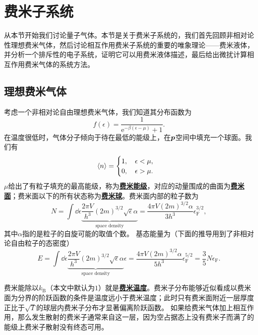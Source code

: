\documentclass[hyperref, UTF8, a4paper]{ctexart}
\newcommand*{\ee}{\mathrm{e}}
\newcommand{\concept}[1]{\underline{\textbf{#1}}}
\begin{document}
\section{费米子系统}

从本节开始我们讨论量子气体。本节是关于费米子系统的，我们首先回顾非相对论性理想费米气体，然后讨论相互作用费米子系统的重要的唯象理论——费米液体，并分析一个排斥性的电子系统，证明它可以用费米液体描述，最后给出微扰计算相互作用费米气体的系统方法。

\subsection{理想费米气体}

考虑一个非相对论自由理想费米气体，我们知道其分布函数为
\begin{equation}
    f(\epsilon) = \frac{1}{\ee^{-\beta(\epsilon - \mu)} + 1}.
\end{equation}
在温度很低时，气体分子倾向于待在最低的能级上，在$\vb*{p}$空间中填充一个球面。我们有
\begin{equation}
    \expval{n} = \begin{cases}
        1, \quad \epsilon < \mu, \\
        0, \quad \epsilon > \mu.
    \end{cases}
\end{equation}
$\mu$给出了有粒子填充的最高能级，称为\concept{费米能级}，对应的动量围成的曲面为\concept{费米面}；费米面以下的所有状态称为\concept{费米球}。费米面内部的粒子数为
\begin{equation}
    N = \int \dd{\epsilon} \underbrace{\frac{2\pi V}{h^3} (2m)^{3/2} \sqrt{\epsilon} \alpha}_\text{space density} = \frac{4\pi V (2m)^{3/2} \alpha}{3h^3} \epsilon_\text{F}^{3/2},
    \label{eq:particle-number-in-fermi-surface}
\end{equation}
其中$\alpha$指的是粒子的自旋可能的取值个数。
基态能量为（下面的推导用到了非相对论自由粒子的态密度）
\begin{equation}
    E = \int \dd{\epsilon} \underbrace{\frac{2\pi V}{h^3} (2m)^{3/2} \sqrt{\epsilon} \alpha}_\text{space density} \epsilon = \frac{4 \pi V (2m)^{3/2} \alpha}{5 h^3} \epsilon_\text{F}^{5/2} = \frac{3}{5} N \epsilon_\text{F}.
\end{equation}

费米能除以$k_\text{B}$（本文中默认为$1$）就是\concept{费米温度}。费米子分布能够近似看成以费米面为分界的阶跃函数的条件是温度远小于费米温度；此时只有费米面附近一层厚度正比于$\sqrt{T}$的球层内费米子分布才显著偏离阶跃函数。
如果给费米气体加上相互作用，那么发生散射的费米子通常来自这一层，因为空占据态上没有费米子而满了的能级上费米子散射没有终态可用。
\end{document}

